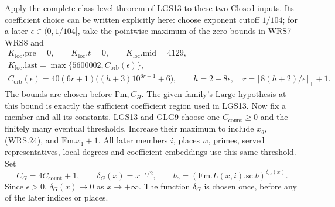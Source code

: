 \documentclass[11pt,a4paper]{article}
\numberwithin{equation}{section}
\theoremstyle{remark}\newtheorem{remark}[theorem]{Remark}
\begin{document}
Apply the complete class-level theorem of LGS13 to these two
\(\mathrm{Closed}\) inputs.  Its coefficient choice can be
written explicitly here: choose exponent cutoff \(1/104\);
for a later \(\epsilon\in(0,1/104]\), take the pointwise maximum
of the zero bounds in WRS7--WRS8 and
\[
 \begin{gathered}
 K_{\mathrm{loc}}.\mathrm{pre}=0,\qquad
 K_{\mathrm{loc}}.t=0,\qquad
 K_{\mathrm{loc}}.\mathrm{mid}=4129,\\
 K_{\mathrm{loc}}.\mathrm{last}
     =\max\{5600002,C_{\mathrm{orb}}(\epsilon)\},\\
 C_{\mathrm{orb}}(\epsilon)
   =40(6r+1)\bigl((h+3)10^{6r+1}+6\bigr),\qquad
 h=2+8\epsilon,\quad r=\lceil8(h+2)/\epsilon\rceil_++1.
 \end{gathered}                                                   \tag{WRS.26}
\]
The bounds are chosen before \(\mathrm{Fm},C_H\).
The given family's \(\mathrm{Large}\) hypothesis at this
bound is exactly the sufficient coefficient region used in LGS13.
Now fix a member and all its constants.  LGS13 and GLG9 choose
one \(C_{\mathrm{count}}\ge0\) and the finitely many eventual
thresholds.  Increase their maximum to include
\(x_g\), (WRS.24), and \(\mathrm{Fm}.x_1+1\).  All later
members \(i\), places \(w\), primes, served representatives,
local degrees and coefficient embeddings use this same threshold.
Set
\[
 C_G=4C_{\mathrm{count}}+1,\qquad
 \delta_G(x)=x^{-\epsilon/2},\qquad
 b_o=(\mathrm{Fm}.L(x,i).\mathrm{sc}.b)^{\delta_G(x)}.
 \tag{WRS.27}
\]
Since \(\epsilon>0\), \(\delta_G(x)\to0\) as \(x\to+\infty\).
The function \(\delta_G\) is chosen once, before any of the
later indices or places.
\end{document}
